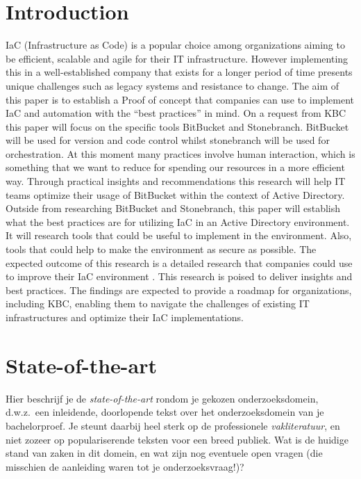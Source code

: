 
\section{Introduction}%
\label{sec:introduction}

IaC (Infrastructure as Code) is a popular choice among organizations aiming to be efficient, scalable and agile for their IT infrastructure. However implementing this in a well-established company that exists for a longer period of time presents unique challenges such as legacy systems and resistance to change. The aim of this paper is to establish a Proof of concept that companies can use to implement IaC and automation with the “best practices” in mind.
On a request from KBC this paper will focus on the specific tools BitBucket and Stonebranch. BitBucket will be used for version and code control whilst stonebranch will be used for orchestration. At this moment many practices involve human interaction, which is something that we want to reduce for spending our resources in a more efficient way. Through practical insights and recommendations this research will help IT teams optimize their usage of BitBucket within the context of Active Directory.
Outside from researching BitBucket and Stonebranch, this paper will establish what the best practices are for utilizing IaC in an Active Directory environment. It will research tools that could be useful to implement in the environment. Also, tools that could help to make the environment as secure as possible.
The expected outcome of this research is a detailed research that companies could use to improve their IaC environment . This research is poised to deliver insights and best practices. The findings are expected to provide a roadmap for organizations, including KBC, enabling them to navigate the challenges of existing IT infrastructures and optimize their IaC implementations.


\section{State-of-the-art}%
\label{sec:state-of-the-art}

Hier beschrijf je de \emph{state-of-the-art} rondom je gekozen onderzoeksdomein, d.w.z.\ een inleidende, doorlopende tekst over het onderzoeksdomein van je bachelorproef. Je steunt daarbij heel sterk op de professionele \emph{vakliteratuur}, en niet zozeer op populariserende teksten voor een breed publiek. Wat is de huidige stand van zaken in dit domein, en wat zijn nog eventuele open vragen (die misschien de aanleiding waren tot je onderzoeksvraag!)?

